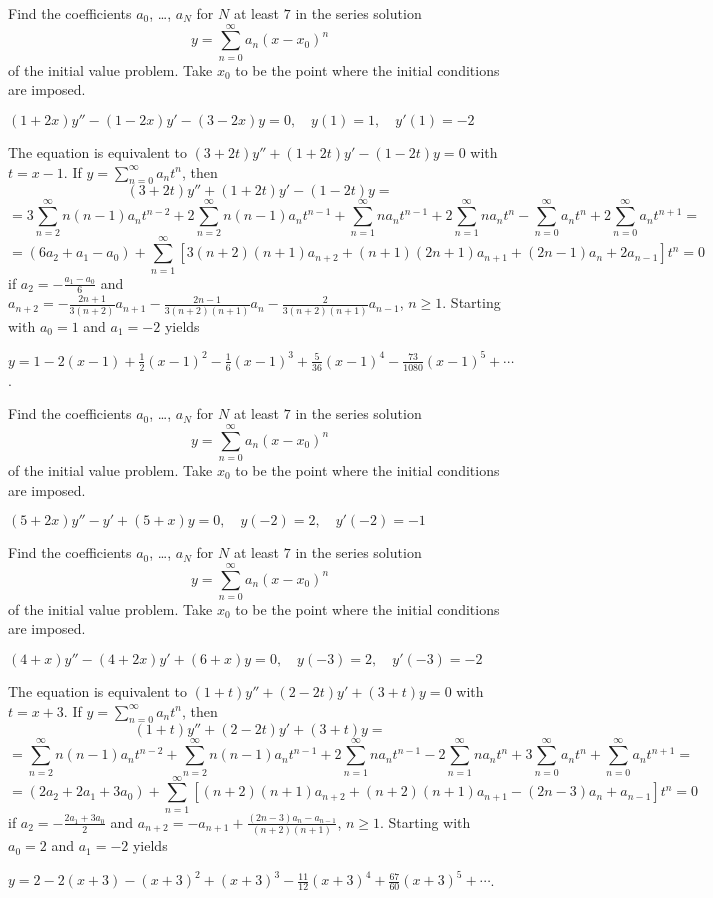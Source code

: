 \documentclass{ximera}
\begin{document}
\begin{problem}\label{exer:7.3.20}
Find
the coefficients  $a_0$, \dots, $a_N$  for $N$ at least $7$
in the series solution
$$
y=\sum_{n=0}^\infty a_n(x-x_0)^n
$$
of the
initial value problem. Take $x_0$ to be the point where the initial
conditions are imposed.

$(1+2x)y''-(1-2x)y'-(3-2x)y=0,\quad y(1)=1,\quad y'(1)=-2$

\begin{solution}
    The equation is equivalent to
 $(3+2t)y''+(1+2t)y'-(1-2t)y=0$ with $t=x-1$.
If $y=\sum_{n=0}^\infty a_nt^n$, then
$$(3+2t)y''+(1+2t)y'-(1-2t)y=$$
$$=3\sum_{n=2}^\infty n(n-1)a_nt^{n-2}
+2\sum_{n=2}^\infty n(n-1)a_nt^{n-1}
+\sum_{n=1}^\infty na_nt^{n-1}
+2\sum_{n=1}^\infty na_nt^n
-\sum_{n=0}^\infty a_nt^n
+2\sum_{n=0}^\infty a_nt^{n+1}=$$
$$=(6a_2+a_1-a_0)+
\sum_{n=1}^\infty[3(n+2)(n+1)a_{n+2}+(n+1)(2n+1)a_{n+1}+
(2n-1)a_n+2a_{n-1}]t^n=0$$  if $a_2=-\frac{a_1-a_0}{6}$ and
$a_{n+2}=-\frac{2n+1}{3(n+2)}a_{n+1}-\frac{2n-1}{3(n+2)(n+1)}a_n
-\frac{2}{3(n+2)(n+1)}a_{n-1}$,
$n\geq 1$. Starting with $a_0=1$ and $a_1=-2$ yields

$y=1-2(x-1)+\frac{1}{2}(x-1)^2-\frac{1}{6}(x-1)^3+\frac{5}{36}(x-1)^4
-\frac{73}{1080}(x-1)^5+\cdots$.
\end{solution}
\end{problem}

\begin{problem}\label{exer:7.3.21}
Find
the coefficients  $a_0$, \dots, $a_N$  for $N$ at least $7$
in the series solution
$$
y=\sum_{n=0}^\infty a_n(x-x_0)^n
$$
of the
initial value problem. Take $x_0$ to be the point where the initial
conditions are imposed.

$(5+2x)y''-y'+(5+x)y=0,\quad y(-2)=2,\quad y'(-2)=-1$
\end{problem}

\begin{problem}\label{exer:7.3.22}
Find
the coefficients  $a_0$, \dots, $a_N$  for $N$ at least $7$
in the series solution
$$
y=\sum_{n=0}^\infty a_n(x-x_0)^n
$$
of the
initial value problem. Take $x_0$ to be the point where the initial
conditions are imposed.

$(4+x)y''-(4+2x)y'+(6+x)y=0,\quad y(-3)=2,\quad y'(-3)=-2$

\begin{solution}
     The equation is equivalent to
 $(1+t)y''+(2-2t)y'+(3+t)y=0$ with $t=x+3$.
If $y=\sum_{n=0}^\infty a_nt^n$, then
$$(1+t)y''+(2-2t)y'+(3+t)y=$$
$$=\sum_{n=2}^\infty n(n-1)a_nt^{n-2}
+\sum_{n=2}^\infty n(n-1)a_nt^{n-1}
+2\sum_{n=1}^\infty na_nt^{n-1}
-2\sum_{n=1}^\infty na_nt^n
+3\sum_{n=0}^\infty a_nt^n
+\sum_{n=0}^\infty a_nt^{n+1}=$$
$$=(2a_2+2a_1+3a_0)+
\sum_{n=1}^\infty[(n+2)(n+1)a_{n+2}+(n+2)(n+1)a_{n+1}
-(2n-3)a_n+a_{n-1}]t^n=0$$  if $a_2=-\frac{2a_1+3a_0}{2}$ and
$a_{n+2}=-a_{n+1}+\frac{(2n-3)a_n-a_{n-1}}{(n+2)(n+1)}$,
$n\geq 1$. Starting with $a_0=2$ and $a_1=-2$ yields

$y=2-2(x+3)-(x+3)^2+(x+3)^3-\frac{11}{12}(x+3)^4+
\frac{67}{60}(x+3)^5+\cdots$.
\end{solution}
\end{problem}
\end{document}
